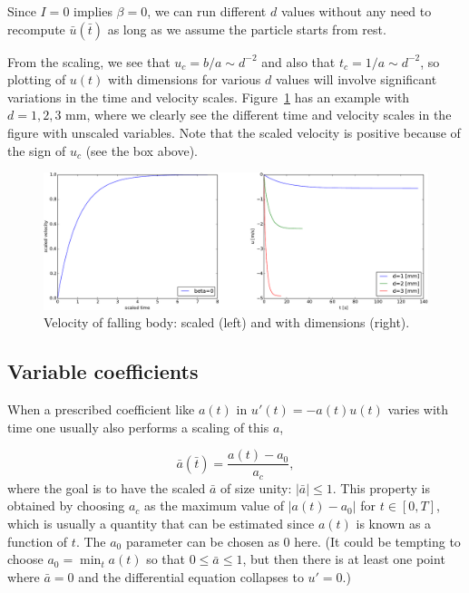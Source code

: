\documentclass[graybox,envcountchap,sectrefs,final]{svmonodo}
\begin{document}
Since $I=0$ implies $\beta=0$, we can run different $d$ values without
any need to recompute $\bar u(\bar t)$ as long as we assume the particle
starts from rest.

From the scaling, we see that $u_c = b/a\sim d^{-2}$ and
also that $t_c=1/a \sim d^{-2}$, so plotting of $u(t)$ with dimensions
for various $d$ values will involve significant variations in the time
and velocity scales. Figure~\ref{sec:scale:body:fig}
has an example with $d=1,2,3$ mm, where we clearly see the different
time and velocity scales in the figure with unscaled variables.
Note that the scaled velocity is positive because of the sign of $u_c$
(see the box above).


\begin{figure}[!ht]  %
  \centerline{\includegraphics[width=1.0\linewidth]{fig-scaling/falling_body.pdf}}
  \caption{
  Velocity of falling body: scaled (left) and with dimensions (right). \label{sec:scale:body:fig}
  }
\end{figure}



\subsection{Variable coefficients}
\label{sec:scale:jump}

When a prescribed coefficient like $a(t)$ in $u'(t) = -a(t)u(t)$
varies with time one usually also
performs a scaling of this $a$,

\[ \bar a(\bar t) = \frac{a(t) - a_0}{a_c}, \]
where the goal is to have the scaled $\bar a$
of size unity: $|\bar a|\leq 1$.
This property is obtained by choosing $a_c$ as the maximum value
of $|a(t)-a_0|$ for $t\in [0,T]$, which is usually a quantity that
can be estimated since $a(t)$ is known as a function of $t$. The $a_0$
parameter can be chosen as 0 here. (It could be tempting to
choose $a_0=\min_t a(t)$ so that $0\leq \bar a\leq 1$, but then there
is at least one point where $\bar a = 0$ and
the differential equation collapses to $u'=0$.)
\end{document}
